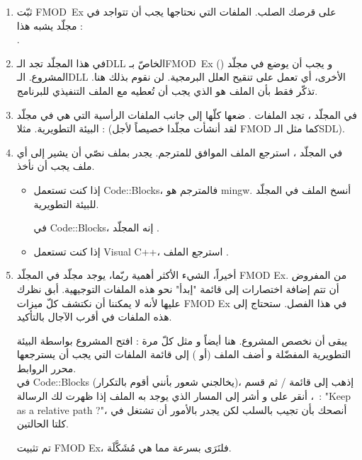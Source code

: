 \begin{enumerate}
	\item ثبّت
	\mbox{\textenglish{FMOD Ex}}
على قرصك الصلب. الملفات التي نحتاجها يجب أن تتواجد في مجلّد يشبه هذا :\\
	.
	\item في هذا المجلّد تجد الـ\textenglish{DLL}
	الخاصّ بـ\mbox{\textenglish{FMOD Ex}}
	()
	و يجب أن يوضع في مجلّد المشروع. الـ\textenglish{DLL}
	الأخرى، أي
	تعمل على تنقيح العلل البرمجية. لن نقوم بذلك هنا. تذكّر فقط بأن الملف
	هو الذي يجب أن تُعطيه مع الملف التنفيذي للبرنامج.
	\item في المجلّد
	،
	تجد الملفات
	.
	ضعها كلّها إلى جانب الملفات الرأسية التي هي في مجلّد البيئة التطويرية. مثلا :
	(لقد أنشأت مجلّدا خصيصاً لأجل
	\textenglish{FMOD}
	كما مثل الـ\textenglish{SDL}).
	\item في المجلّد
	،
	استرجع الملف الموافق للمترجم. يجدر بملف نصّي أن يشير إلى أي ملف يجب أن نأخذ.
	\begin{itemize}
		\item إذا كنت تستعمل
		\textenglish{Code::Blocks}،
		فالمترجم هو
		\textenglish{mingw}.
		أنسخ الملف
		في المجلّد
		للبيئة التطويرية.
		
		في
		\textenglish{Code::Blocks}،
		إنه المجلّد
		.
		\item إذا كنت تستعمل
		\textenglish{Visual C++}،
		استرجع الملف
		.
	\end{itemize}
	\item أخيراً، الشيء الأكثر أهمية ربّما، يوجد مجلّد 
	في المجلّد
	\textenglish{FMOD Ex}.
	من المفروض أن تتم إضافة اختصارات إلى قائمة "إبدأ" نحو هذه الملفات التوجيهية. أبق نظرك عليها لأنه لا يمكننا أن نكتشف كلّ ميزات
	\textenglish{FMOD Ex}
	في هذا الفصل. ستحتاج إلى هذه الملفات في أقرب الآجال بالتأكيد.
	
	يبقى أن نخصص المشروع. هنا أيضاً و مثل كلّ مرة : افتح المشروع بواسطة البيئة التطويرية المفضّلة و أضف الملف
	(أو
	)
	إلى قائمة الملفات التي يجب أن يسترجعها محرر الروابط.\\
	في
	\textenglish{Code::Blocks}
	(يخالجني شعور بأنني أقوم بالتكرار)، إذهب إلى قائمة
	 / 
	ثم قسم
	،
	أنقر على
	و أشر إلى المسار الذي يوجد به الملف
	إذا ظهرت لك الرسالة~:
	"\textenglish{Keep as a relative path ?}"،
	أنصحك بأن تجيب بالسلب لكن يجدر بالأمور أن تشتغل في كلتا الحالتين.
	
	تم تثبيت
	\textenglish{FMOD Ex}،
	فلنَرَى بسرعة مما هي مُشَكَّلَة.
\end{enumerate}

